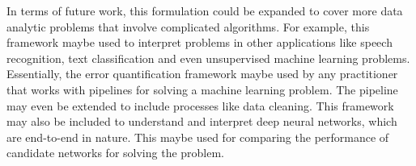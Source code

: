In terms of future work, this formulation could be expanded to cover more data analytic problems that involve complicated algorithms. For example, this framework maybe used to interpret problems in other applications like speech recognition, text classification and even unsupervised machine learning problems. Essentially, the error quantification framework maybe used by any practitioner that works with pipelines for solving a machine learning problem. The pipeline may even be extended to include processes like data cleaning. This framework may also be included to understand and interpret deep neural networks, which are end-to-end in nature. This maybe used for comparing the performance of candidate networks for solving the problem.


\label{sec5}
